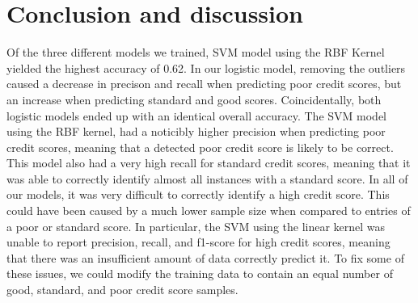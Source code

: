 \documentclass[11pt, twocolumn]{article}
\begin{document}
\section*{Conclusion and discussion}
Of the three different models we trained, SVM model using the RBF Kernel yielded the highest
accuracy of 0.62. In our logistic model, removing the outliers caused a decrease in precison
and recall when predicting poor credit scores, but an increase when predicting standard and good
scores. Coincidentally, both logistic models ended up with an identical overall accuracy.
\vspace{5mm}\newline
The SVM model using the RBF kernel, had a noticibly higher precision when predicting poor credit
scores, meaning that a detected poor credit score is likely to be correct. This model also had a
very high recall for standard credit scores, meaning that it was able to correctly identify almost all
instances with a standard score.
\vspace{5mm}\newline
In all of our models, it was very difficult to correctly identify a high credit score. This could have
been caused by a much lower sample size when compared to entries of a poor or standard score. In particular,
the SVM using the linear kernel was unable to report precision, recall, and f1-score for high credit scores,
meaning that there was an insufficient amount of data correctly predict it. To fix some of these issues,
we could modify the training data to contain an equal number of good, standard, and poor credit score samples. 
\end{document}
